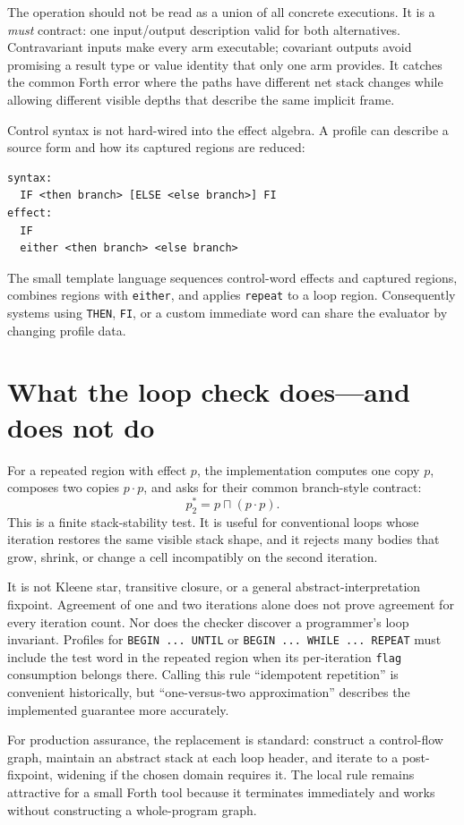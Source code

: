 \documentclass[10pt,a4paper]{article}
\newcommand{\meet}{\mathbin{\sqcap}}
\newcommand{\seq}{\mathbin{\cdot}}
\begin{document}
The operation should not be read as a union of all concrete executions.  It is
a \emph{must} contract: one input/output description valid for both
alternatives.  Contravariant inputs make every arm executable; covariant
outputs avoid promising a result type or value identity that only one arm
provides.  It catches the common Forth error where the paths have different net
stack changes while allowing different visible depths that describe the same
implicit frame.

Control syntax is not hard-wired into the effect algebra.  A profile can
describe a source form and how its captured regions are reduced:
\begin{lstlisting}
syntax:
  IF <then branch> [ELSE <else branch>] FI
effect:
  IF
  either <then branch> <else branch>
\end{lstlisting}
The small template language sequences control-word effects and captured
regions, combines regions with \texttt{either}, and applies \texttt{repeat} to
a loop region.  Consequently systems using \texttt{THEN}, \texttt{FI}, or a
custom immediate word can share the evaluator by changing profile data.

\section{What the loop check does---and does not do}

For a repeated region with effect $p$, the implementation computes one copy
$p$, composes two copies $p\seq p$, and asks for their common branch-style
contract:
\[
                         p^*_2 = p\meet(p\seq p).
\]
This is a finite stack-stability test.  It is useful for conventional loops
whose iteration restores the same visible stack shape, and it rejects many
bodies that grow, shrink, or change a cell incompatibly on the second
iteration.

It is not Kleene star, transitive closure, or a general abstract-interpretation
fixpoint.  Agreement of one and two iterations alone does not prove agreement
for every iteration count.  Nor does the checker discover a programmer's loop
invariant.  Profiles for \texttt{BEGIN ... UNTIL} or
\texttt{BEGIN ... WHILE ... REPEAT} must include the test word in the repeated
region when its per-iteration \texttt{flag} consumption belongs there.
Calling this rule ``idempotent repetition'' is convenient historically, but
``one-versus-two approximation'' describes the implemented guarantee more
accurately.

For production assurance, the replacement is standard: construct a
control-flow graph, maintain an abstract stack at each loop header, and
iterate to a post-fixpoint, widening if the chosen domain requires it.  The
local rule remains attractive for a small Forth tool because it terminates
immediately and works without constructing a whole-program graph.
\end{document}
